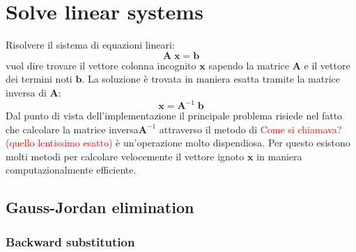 \documentclass[10pt]{article}
\begin{document}
\section{Solve linear systems}

Risolvere il sistema di equazioni lineari:
\begin{equation}
\mathbf{A} \; \mathbf{x} = \mathbf{b}
\label{eq:lin_sys}
\end{equation}
vuol dire trovare il vettore colonna incognito $\mathbf{x}$ sapendo la matrice $\mathbf{A}$ e il vettore dei termini noti $\mathbf{b}$. La soluzione è trovata in maniera esatta tramite la matrice inversa di $\mathbf{A}$:
\begin{equation}
\mathbf{x} = \mathbf{A}^{-1} \; \mathbf{b}
\end{equation}
Dal punto di vista dell'implementazione il principale problema risiede nel fatto che calcolare la matrice inversa$\mathbf{A}^{-1}$ attraverso il metodo di \textcolor{red}{Come si chiamava? (quello lentissimo esatto)} è un'operazione molto dispendiosa.
Per questo esistono molti metodi per calcolare velocemente il vettore ignoto $\mathbf{x}$ in maniera computazionalmente efficiente.



\subsection{Gauss-Jordan elimination}


\subsubsection{Backward substitution}
\end{document}
